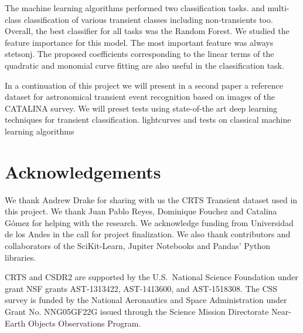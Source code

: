 \documentclass[a4paper,fleqn,usenatbib]{mnras}
\begin{document}
The machine learning algorithms performed two classification tasks.
and multi-class classification of various transient classes including
non-transients too. 
Overall, the best classifier for all tasks was the Random Forest.
We studied the feature importance for this model.
The most important feature was always stetson\textunderscore j.
The proposed coefficients corresponding to the linear terms of the
quadratic and monomial curve fitting are also useful in the
classification task.


In a continuation of this project we will present in a second paper a
reference dataset for astronomical transient event recognition based
on images of the CATALINA survey. 
We will preset tests using state-of-the art deep learning
techniques for transient classification.
 lightcurves and tests on classical machine learning algorithms



\section*{Acknowledgements}

We thank Andrew Drake for sharing with us the CRTS Transient dataset
used in this project.  
We thank Juan Pablo Reyes, Dominique Fouchez and Catalina G\'omez for
helping with the research. 
We acknowledge funding from Universidad de los Andes in the call for
project finalization.
We also thank contributors and collaborators of the SciKit-Learn,
Jupiter Notebooks and Pandas' Python libraries.  

CRTS and CSDR2 are supported by the U.S.~National Science 
Foundation under grant NSF grants AST-1313422, AST-1413600, and 
AST-1518308.  The CSS survey is funded by the National Aeronautics
and Space Administration under Grant No. NNG05GF22G issued through
the Science Mission Directorate Near-Earth Objects Observations Program.





\end{document}
